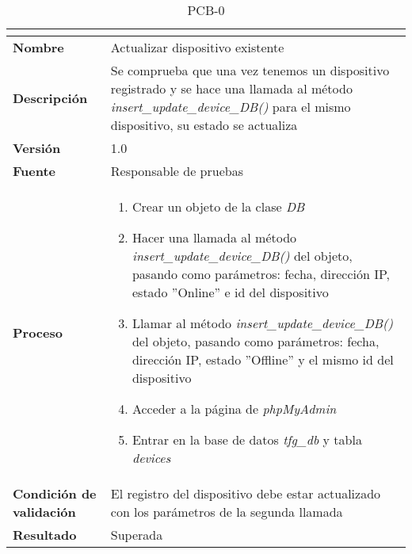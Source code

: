 \begin{table}[H]
	\caption{PCB-0\number\pcb}
	\begin{tabular}{|l|p{}|}
		\hline
		\multicolumn{2}{|c|}{\cellcolor[HTML]{BFBFBF}{\color[HTML]{000000} \textbf{PCB-0\number\pcb}}} \\ \hline
		\textbf{Nombre}                  & Actualizar dispositivo existente                                                                                                                                                   \\ \hline
		\textbf{Descripción}             & Se comprueba que una vez tenemos un dispositivo registrado y se hace una llamada al método \textit{insert\_update\_device\_DB()} para el mismo dispositivo, su estado se actualiza \\ \hline
		\textbf{Versión}                 & 1.0                                                                                                                                                                                \\ \hline
		\textbf{Fuente}                  & Responsable de pruebas                                                                                                                                                             \\ \hline
		\textbf{Proceso}                 & \begin{enumerate}
			\item Crear un objeto de la clase \textit{DB}
			\item Hacer una llamada al método \textit{insert\_update\_device\_DB()} del objeto, pasando como parámetros: fecha, dirección IP, estado ''Online'' e id del dispositivo
			\item Llamar al método \textit{insert\_update\_device\_DB()} del objeto, pasando como parámetros: fecha, dirección IP, estado ''Offline'' y el mismo id del dispositivo
			\item Acceder a la página de \textit{phpMyAdmin}
			\item Entrar en la base de datos \textit{tfg\_db} y tabla \textit{devices}
		\end{enumerate}                                                                                                                                                          \\ \hline
		\textbf{Condición de validación} & El registro del dispositivo debe estar actualizado con los parámetros de la segunda llamada                                                                                        \\ \hline
		\textbf{Resultado}               & Superada                                                                                                                                                                           \\ \hline
	\end{tabular}
\end{table}
